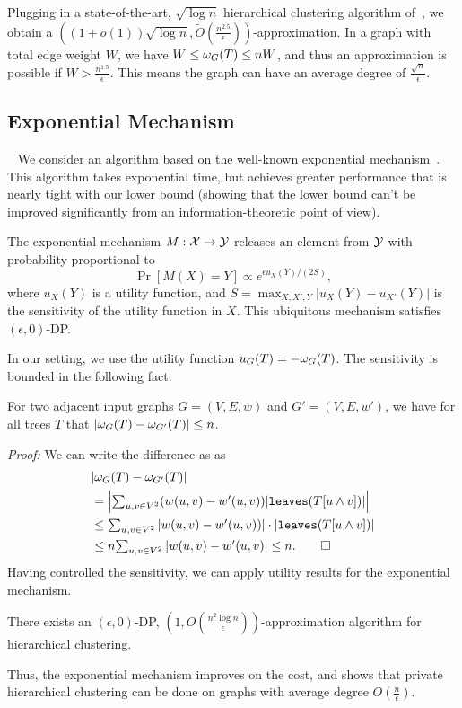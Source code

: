 Plugging in a state-of-the-art, $\sqrt{\log n}$ hierarchical clustering algorithm of~\citet{charikar2017approximate}, we obtain a $((1+o(1)) \sqrt{\log n}, \tilde{O}(\frac{n^{2.5}}{\epsilon}))$-approximation. In a graph with total edge weight $W$, we have $W \leq \omega_G(T) \leq nW$, and thus an approximation is possible if $W > \frac{n^{1.5}}{\epsilon}$. This means the graph can have an average degree of $\frac{\sqrt{n}}{\epsilon}$.

\subsection{Exponential Mechanism}~\label{chap5-sec:hc-exp}
We consider an algorithm based on the well-known exponential mechanism~\citep{mcsherry2007mechanism}. This algorithm takes exponential time, but achieves greater performance that is nearly tight with our lower bound (showing that the lower bound can't be improved significantly from an information-theoretic point of view).

The exponential mechanism $M : \mathcal{X} \rightarrow \mathcal{Y}$ releases an element from $\mathcal{Y}$ with probability proportional to 
\[
    \Pr[M(X) = Y] \propto e^{\epsilon u_X(Y) / (2S)},
\]
where $u_X(Y)$ is a utility function, and $S = \max_{X,X',Y}|u_X(Y) - u_{X'}(Y)|$ is the sensitivity of the utility function in $X$. This ubiquitous mechanism satisfies $(\epsilon, 0)$-DP. 

In our setting, we use the utility function $u_G(T) = -\omega_G(T)$.
The sensitivity is bounded in the following fact.
\begin{fact}
For two adjacent input graphs $G = (V,E,w)$ and $G' = (V,E,w')$, we have for all trees $T$ that $|\omega_{G}(T) - \omega_{G'}(T)| \leq n$.
\end{fact}
\noindent\textit{Proof:}
    We can write the difference as as 
    \begin{align*}
        &|\cost_G(T) - \cost_{G'}(T)| \\ 
        &= \textstyle{\left|\sum_{u,v \in V^2} (w(u,v) - w'(u,v))|\texttt{leaves}(T[u\wedge v])| \right|} \\
        &\leq \textstyle{\sum_{u,v \in V^2} |w(u,v) - w'(u,v))| \cdot |\texttt{leaves}(T[u\wedge v])|} \\
        &\leq n \textstyle{\sum_{u,v \in V^2} |w(u,v) - w'(u,v)| \leq n}. \hfill \qed
    \end{align*}
Having controlled the sensitivity, we can apply utility results for the exponential mechanism.
\begin{lem}\label{chap5-lem:exp-util}
There exists an $(\epsilon, 0)$-DP, $(1, O(\frac{n^2 \log n}{\epsilon}))$-approximation algorithm for hierarchical clustering.
\end{lem}

Thus, the exponential mechanism improves on the cost, and shows that private hierarchical clustering can be done on graphs with average degree $O(\frac{n}{\epsilon})$.
